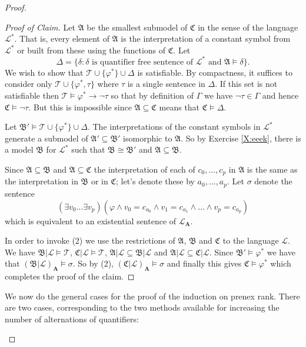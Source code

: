 \documentclass[titlepage, oneside]{amsbook}
\theoremstyle{plain}
\theoremstyle{definition}
\theoremstyle{remark}
\newcommand{\theory}{\ensuremath{\mathcal{T}}}
\newcommand{\lan}{\ensuremath{\mathcal{L}}}
\newcommand{\seq}{\ensuremath{\subseteq}}
\newcommand{\ma}{\ensuremath{\mathfrak{A}}}
\newcommand{\mb}{\ensuremath{\mathfrak{B}}}
\newcommand{\mc}{\ensuremath{\mathfrak{C}}}
\newcommand{\ba}{\ensuremath{\mathbf{A}}}
\newcommand{\exv}[2][0]{\ensuremath{\exists v_{#1}  \dots  \exists
v_{#2}}}
\begin{document}
\begin{proof}
\begin{proof}[Proof of Claim]
Let $\ma$ be the smallest submodel of $\mc $ in the sense of the language 
$\lan^{\ast}$.  That is, every element of $\ma$ is the interpretation of a constant symbol from $\lan ^{\ast}$ or built from these using the functions of $\mc$. Let
 \[ 
 \Delta = \{ \delta : \delta \mbox{ is quantifier free sentence of } \lan ^{*} 
\mbox{ and } \ma \models \delta \}.
\]
We wish to show that $\theory \cup \{ \varphi^{\ast} \} \cup \Delta $ is
satisfiable.  By compactness, it suffices to consider only 
$\theory \cup \{ \varphi^{\ast} , \tau \}$ where $\tau$ is a single 
sentence in $\Delta$.  If this set is not satisfiable then 
$\theory \models \varphi^{\ast} \to \neg \tau $ so that by definition of 
$\Gamma$ we have
$\neg \tau \in \Gamma$ and hence $\mc \models \neg  \tau$.  But this is
impossible since $\ma \seq \mc$ means that $\mc \models \Delta $.

Let $\mb' \models \theory \cup \{ \varphi^{\ast} \} \cup \Delta$.  The
interpretations of the constant symbols in $\lan ^{\ast}$ generate a submodel of $\ma' \seq \mb'$ isomorphic to  $\ma$. So by Exercise \ref{X:eeek}, there is a model $\mb$ for $\lan^{\ast}$ such that $\mb \cong \mb'$ and $\ma \seq \mb$.

Since $\ma \seq \mb$ and $\ma \seq \mc$ the interpretation of each of $c_{0},\dots,c_{p}$ in $\ma$ is the same as the interpretation in $\mb$ or in 
$\mc$; let's denote these by $a_{0},\dots,a_{p}$. Let $\sigma$ denote the sentence
\[
   ( \exv[0]{p} )(\varphi \wedge v_{0} = c_{a_{0}} \wedge v_{1} = c_{a_{1}}
\wedge \dots \wedge v_{p} = c_{a_{p}})
\] 
which is equivalent to an existential sentence of $\lan_{\ba}$. 

In order to invoke (2) we use the restrictions of $\ma$, $\mb$ and $\mc$ to the language $\lan$.  We have $\mb |\lan \models \theory$, 
$\mc |\lan \models \theory$, $\ma |\lan \seq \mb | \lan$ and 
$\ma | \lan \seq \mc | \lan$.
Since $\mb' \models \varphi^{\ast}$ we have that 
$(\mb | \lan )_\ba \models \sigma$. 
So by (2), $(\mc | \lan )_\ba \models \sigma$ and finally this gives  $\mc \models \varphi^{\ast}$ which completes the proof of the claim.

\renewcommand{\qedsymbol}{}

\end{proof}

We now do the general cases for the proof of the induction on prenex
rank.  There are two cases, corresponding to the two methods available
for increasing the number of alternations of quantifiers:
\begin{itemize}


\end{itemize}
\end{proof}
\end{document}
